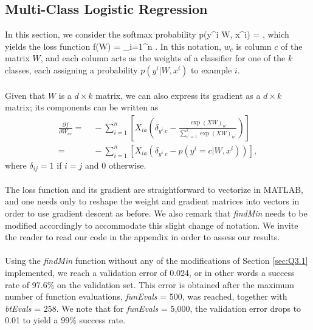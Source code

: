 \subsection{Multi-Class Logistic Regression}

In this section, we consider the softmax probability
\be p(y^i \vert W, x^i) = , \ee
which yields the loss function
\be f(W) = \sum_{i=1}^n \left[ - w_{y^i}^T x^i  + \log \left( \sum_{c^\prime = 1}^k \exp(w_c^T x^i) \right) \right]. \ee
In this notation, $w_c$ is column $c$ of the matrix $W$, and each column acts as the weights of a classifier for one of the $k$ classes, each assigning a probability $p(y^i \vert W, x^i)$ to example $i$. \\
\\
Given that $W$ is a $d \times k$ matrix, we can also express its gradient as a $d \times k$ matrix; its components can be written as
\begin{align} \frac{\partial f}{\partial W_{ac}} =&\; - \sum_{i=1}^n \left[ X_{i a} \left( \delta_{y^i \; c} - \frac{ \exp(XW)_{ic} }{\sum_{c^\prime=1}^k \exp(XW)_{ic^\prime}} \right) \right] \\
=&\;  - \sum_{i=1}^n \left[ X_{i a} \left( \delta_{y^i \; c} - p(y^i = c \vert W, x^i) \right) \right], \end{align}
where $\delta_{ij} = 1$ if $i=j$ and 0 otherwise. \\
\\
The loss function and its gradient are straightforward to vectorize in MATLAB, and one needs only to reshape the weight and gradient matrices into vectors in order to use gradient descent as before. We also remark that \textit{findMin} needs to be modified accordingly to accommodate this slight change of notation. We invite the reader to read our code in the appendix in order to assess our results.\\
\\
Using the \textit{findMin} function without any of the modifications of Section \ref{sec:Q3.1} implemented, we reach a validation error of 0.024, or in other words a success rate of 97.6\% on the validation set. This error is obtained after the maximum number of function evaluations, \textit{funEvals} = 500, was reached, together with \textit{btEvals} = 258. We note that for \textit{funEvals} = 5,000, the validation error drops to 0.01 to yield a 99\% success rate.
